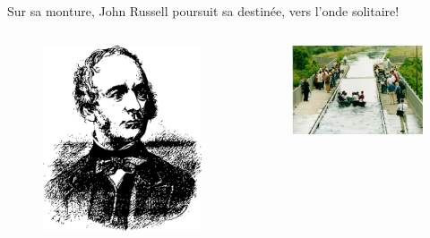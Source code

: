 \documentclass[handout]{beamer}
\begin{document}
\begin{frame}
Sur sa monture, John Russell poursuit sa destinée, vers l'onde solitaire!
\begin{columns}[T]
    \begin{column}[T]{.5\linewidth}
   \begin{figure}[0.3\textwidth]
 \includegraphics[scale=0.25]{russell.png}
    \end{figure}
    \end{column}
    \begin{column}[T]{.5\linewidth}
    \begin{figure}[0.3\textwidth]
   \includegraphics[scale=0.2]{soliton1b.png}
    \end{figure}
    \end{column}
  \end{columns}
\end{frame}
\end{document}
